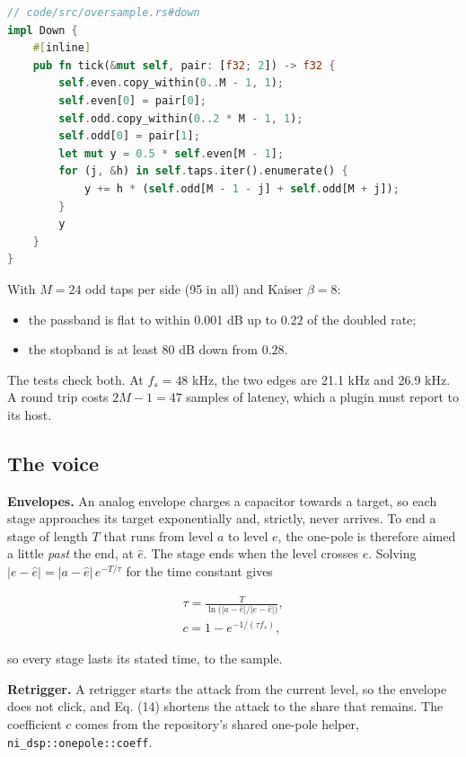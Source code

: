 \documentclass[conference]{IEEEtran}
\begin{document}
\begin{lstlisting}[language=Rust]
// code/src/oversample.rs#down
impl Down {
    #[inline]
    pub fn tick(&mut self, pair: [f32; 2]) -> f32 {
        self.even.copy_within(0..M - 1, 1);
        self.even[0] = pair[0];
        self.odd.copy_within(0..2 * M - 1, 1);
        self.odd[0] = pair[1];
        let mut y = 0.5 * self.even[M - 1];
        for (j, &h) in self.taps.iter().enumerate() {
            y += h * (self.odd[M - 1 - j] + self.odd[M + j]);
        }
        y
    }
}
\end{lstlisting}

With $M = 24$ odd taps per side (95 in all) and Kaiser $\beta = 8$:

\begin{itemize}
\item the passband is flat to within 0.001 dB up to $0.22$ of the doubled rate;
\item the stopband is at least 80 dB down from $0.28$.
\end{itemize}

The tests check both. At $f_s = 48$ kHz, the two edges are 21.1 kHz and 26.9 kHz. A round trip costs $2M - 1 = 47$ samples of latency, which a plugin must report to its host.

\setcounter{subsection}{8}
\subsection{The voice}
\textbf{Envelopes.} An analog envelope charges a capacitor towards a target, so each stage approaches its target exponentially and, strictly, never arrives. To end a stage of length $T$ that runs from level $a$ to level $e$, the one-pole is therefore aimed a little \emph{past} the end, at $\hat e$. The stage ends when the level crosses $e$. Solving $\lvert e - \hat e\rvert = \lvert a - \hat e\rvert\, e^{-T/\tau}$ for the time constant gives

\begin{equation*}
\begin{gathered}
\tau = \frac{T}{\ln\!\big(\lvert a - \hat e\rvert / \lvert e - \hat e\rvert\big)}, \\
c = 1 - e^{-1/(\tau f_s)},
\end{gathered}
\tag{14}
\end{equation*}

so every stage lasts its stated time, to the sample.

\textbf{Retrigger.} A retrigger starts the attack from the current level, so the envelope does not click, and Eq. (14) shortens the attack to the share that remains. The coefficient $c$ comes from the repository's shared one-pole helper, \texttt{ni\_\allowbreak{}dsp::\allowbreak{}onepole::\allowbreak{}coeff}.
\end{document}
